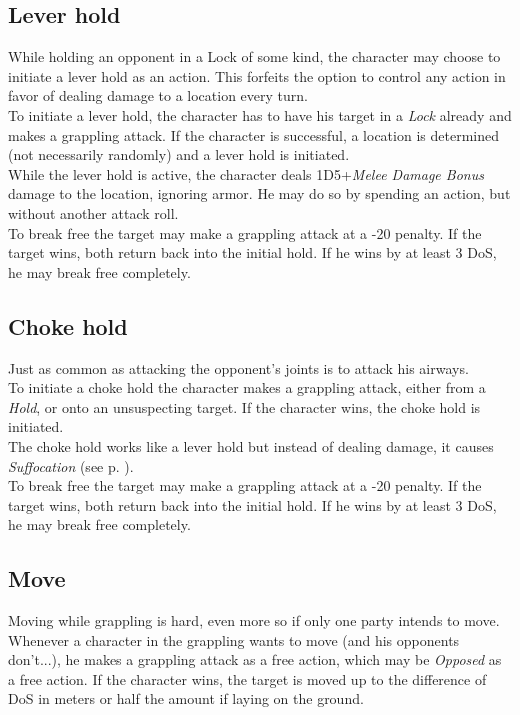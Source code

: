 \subsection*{Lever hold}
While holding an opponent in a Lock of some kind, the character may choose to initiate a lever hold as an action.
This forfeits the option to control any action in favor of dealing damage to a location every turn.
\\%
To initiate a lever hold,
	the character has to have his target in a \emph{Lock} already
	and makes a grappling attack.
If the character is successful,
	a location is determined (not necessarily randomly)
	and a lever hold is initiated.
\\%
While the lever hold is active,
	the character deals 1D5+\emph{Melee Damage Bonus} damage to the location,
	ignoring armor.
He may do so by spending an action,
	but without another attack roll.
\\%
To break free the target may make a grappling attack at a -20  penalty.
If the target wins, both return back into the initial hold.
If he wins by at least 3 DoS, he may break free completely.
\subsection*{Choke hold}
Just as common as attacking the opponent's joints is to attack his airways.\\
To initiate a choke hold the character makes a grappling attack,
	either from a \emph{Hold},
	or onto an unsuspecting target.
If the character wins, the choke hold is initiated.\\
The choke hold works like a lever hold but instead of dealing damage, it causes \emph{Suffocation} (see p. \pageref{hazards:suffocation}).\\
To break free the target may make a grappling attack at a -20  penalty.
If the target wins, both return back into the initial hold.
If he wins by at least 3 DoS, he may break free completely.
\subsection*{Move}
Moving while grappling is hard, even more so if only one party intends to move.\\
Whenever a character in the grappling wants to move
	(and his opponents don't...),
	he makes a grappling attack as a free action,
	which may be \emph{Opposed} as a free action.
If the character wins, the target is moved up to the difference of DoS in meters
	or half the amount if laying on the ground.

